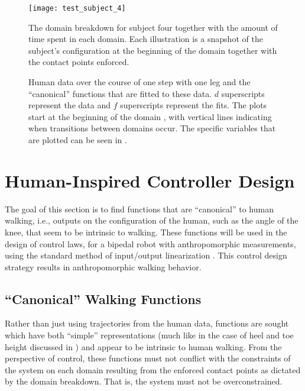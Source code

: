 \begin{figure}[t]
  \centering
  \texttt{[image: test\_subject\_4]}
  \caption[The domain breakdown for subject four]{The domain breakdown for subject four together with the amount of time spent in each domain. Each illustration is a snapshot of the subject's configuration at the beginning of the domain together with the contact points enforced.}
  \label{fred}
\end{figure}

\begin{figure}[t!]
  \centering
  \caption[Human data over the course of one step with one leg]{Human data over the course of one step with one leg and the ``canonical'' functions that are fitted to these data. $d$ superscripts represent the data and $f$ superscripts represent the fits. The plots start at the beginning of the domain {\DA}, with vertical lines indicating when transitions between domains occur. The specific variables that are plotted can be seen in .}
  \label{fig:constraints-fitting}
\end{figure}

\section{Human-Inspired Controller Design} \noindent
The goal of this section is to find functions that are ``canonical'' to human
walking, i.e., outputs on the configuration of the human, such as the angle of
the knee, that seem to be intrinsic to walking. These functions will be used in
the design of control laws, for a bipedal robot with anthropomorphic
measurements, using the standard method of input/output linearization
\cite{Sastry1999}. This control design strategy results in anthropomorphic
walking behavior.

\subsection{``Canonical'' Walking Functions} \label{sec:functions} \noindent
Rather than just using trajectories from the human data, functions are sought which have both ``simple'' representations (much like in the case of heel and toe height discussed in ) and appear to be intrinsic to human walking. From the perspective of control, these functions must not conflict with the constraints of the system on each domain resulting from the enforced contact points as dictated by the domain breakdown. That is, the system must not be overconstrained.

